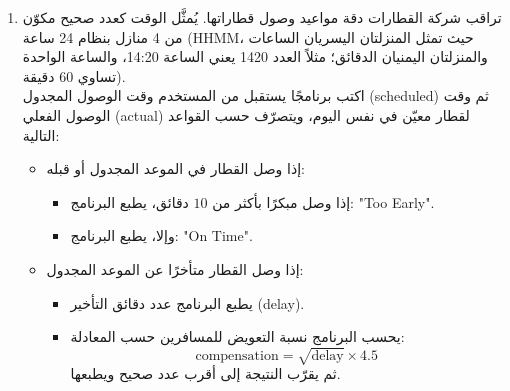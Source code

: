 \documentclass[14pt]{extarticle}
\begin{document}
\begin{enumerate}[resume, itemsep=2.2em]
\ifwithsols
\begin{boxSolution}
\begin{english}
\begin{verbatim}
Console.WriteLine("Enter 4-digit PIN:");
int pin = int.Parse(Console.ReadLine());

int units = pin % 10;
int tens = (pin / 10) % 10;
int hundreds = (pin / 100) % 10;
int thousands = pin / 1000;

int outerSum = thousands + units;
int innerSum = hundreds + tens;

Console.WriteLine("Outer digits sum: " + outerSum);
Console.WriteLine("Inner digits sum: " + innerSum);

int max1 = Math.Max(thousands, hundreds);
int max2 = Math.Max(tens, units);
int maxDigit = Math.Max(max1, max2);

if (thousands != units && Math.Abs(outerSum - innerSum) == 1 && maxDigit >= 7)
{
    Console.WriteLine("Strong PIN");
}
else
{
    Console.WriteLine("Weak PIN");
}
\end{verbatim}
\end{english}
\end{boxSolution}
\fi
\filbreak

\item
تراقب شركة القطارات دقة مواعيد وصول قطاراتها. يُمثَّل الوقت كعدد صحيح مكوّن من 4 منازل بنظام 24 ساعة (\textenglish{HHMM}، حيث تمثل المنزلتان اليسريان الساعات والمنزلتان اليمنيان الدقائق؛ مثلاً العدد \textenglish{1420} يعني الساعة \textenglish{14:20}، والساعة الواحدة تساوي $60$ دقيقة). \\
اكتب برنامجًا يستقبل من المستخدم وقت الوصول المجدول (\textenglish{scheduled}) ثم وقت الوصول الفعلي (\textenglish{actual}) لقطار معيّن في نفس اليوم، ويتصرّف حسب القواعد التالية:
\begin{itemize}
    \item إذا وصل القطار في الموعد المجدول أو قبله:
    \begin{itemize}[nosep]
        \item إذا وصل مبكرًا بأكثر من $10$ دقائق، يطبع البرنامج: \textenglish{"Too Early"}.
        \item وإلا، يطبع البرنامج: \textenglish{"On Time"}.
    \end{itemize}
    \item إذا وصل القطار متأخرًا عن الموعد المجدول:
    \begin{itemize}[nosep]
        \item يطبع البرنامج عدد دقائق التأخير (\textenglish{delay}).
        \item يحسب البرنامج نسبة التعويض للمسافرين حسب المعادلة:
        $$ \text{compensation} = \sqrt{\text{delay}} \times 4.5 $$
        ثم يقرّب النتيجة إلى أقرب عدد صحيح ويطبعها.
    \end{itemize}
\end{itemize}


\end{enumerate}
\end{document}
